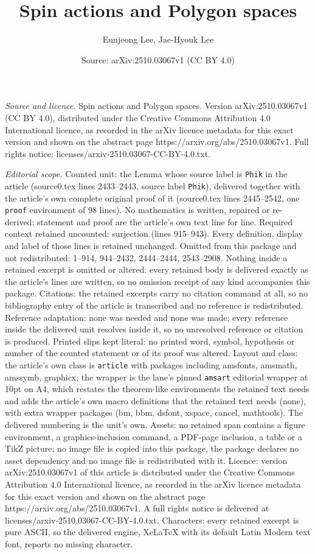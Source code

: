 \documentclass[10pt,a4paper]{amsart}
\title[Spin actions and Polygon spaces]{Spin actions and Polygon spaces}
\author{Eunjeong Lee, Jae-Hyouk Lee}
\date{Source: arXiv:2510.03067v1 (CC BY 4.0)}
\begin{document}
\maketitle

\noindent\emph{Source and licence.} Spin actions and Polygon spaces. Version arXiv:2510.03067v1 (CC BY 4.0), distributed under the Creative Commons Attribution 4.0 International licence, as recorded in the arXiv licence metadata for this exact version and shown on the abstract page https://arxiv.org/abs/2510.03067v1. Full rights notice: licenses/arxiv-2510.03067-CC-BY-4.0.txt.\par\smallskip

\noindent\textit{Editorial scope.} Counted unit: the Lemma whose source label is \texttt{Phik} in the article (source0.tex lines 2433--2443, source label \texttt{Phik}), delivered together with the article's own complete original proof of it (source0.tex lines 2445--2542, one \texttt{proof} environment of 98 lines). No mathematics is written, repaired or re-derived: statement and proof are the article's own text line for line. Required context retained uncounted: surjection (lines 915--943). Every definition, display and label of those lines is retained unchanged. Omitted from this package and not redistributed: 1--914, 944--2432, 2444--2444, 2543--2908. Nothing inside a retained excerpt is omitted or altered: every retained body is delivered exactly as the article's lines are written, so no omission receipt of any kind accompanies this package. Citations: the retained excerpts carry no citation command at all, so no bibliography entry of the article is transcribed and no reference is redistributed. Reference adaptation: none was needed and none was made; every reference inside the delivered unit resolves inside it, so no unresolved reference or citation is produced. Printed slips kept literal: no printed word, symbol, hypothesis or number of the counted statement or of its proof was altered. Layout and class: the article's own class is \texttt{article} with packages including amsfonts, amsmath, amssymb, graphicx; the wrapper is the lane's pinned \texttt{amsart} editorial wrapper at 10pt on A4, which restates the theorem-like environments the retained text needs and adds the article's own macro definitions that the retained text needs (none), with extra wrapper packages (bm, bbm, dsfont, xspace, cancel, mathtools). The delivered numbering is the unit's own. Assets: no retained span contains a figure environment, a graphics-inclusion command, a PDF-page inclusion, a table or a TikZ picture; no image file is copied into this package, the package declares no asset dependency and no image file is redistributed with it. Licence: version arXiv:2510.03067v1 of this article is distributed under the Creative Commons Attribution 4.0 International licence, as recorded in the arXiv licence metadata for this exact version and shown on the abstract page https://arxiv.org/abs/2510.03067v1. A full rights notice is delivered at licenses/arxiv-2510.03067-CC-BY-4.0.txt. Characters: every retained excerpt is pure ASCII, so the delivered engine, XeLaTeX with its default Latin Modern text font, reports no missing character.
\end{document}
